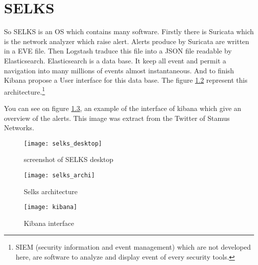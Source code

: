 
\chapter{SELKS}
\label{chap:selks}


So SELKS is an OS which contains many software. Firstly there is Suricata which is the network analyzer which raise
alert. Alerts produce by Suricata are written in a EVE file. Then Logstash traduce this file into a JSON file
readable by Elasticsearch. Elasticsearch is a data base. It keep all event and permit a navigation into many
millions of events almost instantaneous. And to finish Kibana propose a User interface for this data base. The
figure \ref{fig:selks_archi} represent this architecture.\footnote{SIEM (security information and event management)
  which are not developed here, are software to analyze and display event of every security tools.}%


You can see on figure \ref{fig:kibana}, an example of the interface of kibana which give an overview of the alerts.
This image was extract from the Twitter of Stamus Networks.


\begin{figure}[h]
  \centering
  \texttt{[image: selks\_desktop]}
  \caption{screenshot of SELKS desktop}
  \label{fig:selks}
\end{figure}

\begin{figure}[h]
  \centering
  \texttt{[image: selks\_archi]}
  \caption{Selks architecture}
  \label{fig:selks_archi}
\end{figure}



\begin{figure}[h]
  \centering
  \texttt{[image: kibana]}
  \caption{Kibana interface}
  \label{fig:kibana}
\end{figure}


